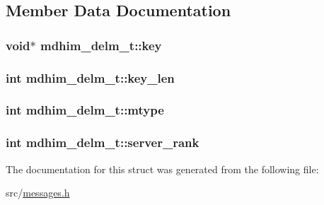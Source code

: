 \subsection{Member Data Documentation}
\hypertarget{structmdhim__delm__t_acedac9daad7ab8b9870f8c7c2a471ced}{
\subsubsection[{key}]{\setlength{\rightskip}{0pt plus 5cm}void$\ast$ mdhim\-\_\-delm\-\_\-t\-::key}}\label{d7/da5/structmdhim__delm__t_acedac9daad7ab8b9870f8c7c2a471ced}
\hypertarget{structmdhim__delm__t_aed818ed56728fe40acd3567fce5a2fb5}{
\subsubsection[{key\-\_\-len}]{\setlength{\rightskip}{0pt plus 5cm}int mdhim\-\_\-delm\-\_\-t\-::key\-\_\-len}}\label{d7/da5/structmdhim__delm__t_aed818ed56728fe40acd3567fce5a2fb5}
\hypertarget{structmdhim__delm__t_aed97225c8df041600c6b5fffb43a1bbc}{
\subsubsection[{mtype}]{\setlength{\rightskip}{0pt plus 5cm}int mdhim\-\_\-delm\-\_\-t\-::mtype}}\label{d7/da5/structmdhim__delm__t_aed97225c8df041600c6b5fffb43a1bbc}
\hypertarget{structmdhim__delm__t_a00480044a106cf24c63e03b3d15320dc}{
\subsubsection[{server\-\_\-rank}]{\setlength{\rightskip}{0pt plus 5cm}int mdhim\-\_\-delm\-\_\-t\-::server\-\_\-rank}}\label{d7/da5/structmdhim__delm__t_a00480044a106cf24c63e03b3d15320dc}


The documentation for this struct was generated from the following file\-:\begin{DoxyCompactItemize}
\item 
src/\hyperlink{messages_8h}{messages.\-h}\end{DoxyCompactItemize}
